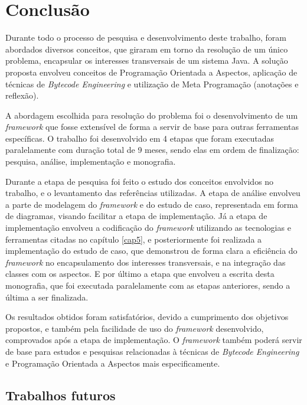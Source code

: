 \documentclass[tc,oneside]{iiufrgs}
\begin{document}
\chapter{Conclusão}

Durante todo o processo de pesquisa e desenvolvimento deste trabalho, foram abordados diversos conceitos, que giraram em torno da resolução de um único problema, encapsular os interesses transversais  de um sistema Java. A solução proposta envolveu conceitos de Programação Orientada a Aspectos, aplicação de técnicas de \textit{Bytecode Engineering} e utilização de Meta Programação (anotações e reflexão).

A abordagem escolhida para resolução do problema foi o desenvolvimento de um \textit{framework} que fosse extensível de forma a servir de base para outras ferramentas específicas. O trabalho foi desenvolvido em 4 etapas que foram executadas paralelamente com duração total de 9 meses, sendo elas em ordem de finalização: pesquisa, análise, implementação e monografia.

Durante a etapa de pesquisa foi feito o estudo dos conceitos envolvidos no trabalho, e o levantamento das referências utilizadas. A etapa de análise envolveu a parte de modelagem do \textit{framework} e do estudo de caso, representada em forma de diagramas, visando facilitar a etapa de implementação. Já a etapa de implementação envolveu a codificação do \textit{framework} utilizando as tecnologias e ferramentas citadas no capítulo \ref{cap5}, e posteriormente foi realizada a implementação do estudo de caso, que demonstrou de forma clara a eficiência do \textit{framework} no encapsulamento dos interesses transversais, e na integração das classes com os aspectos. E por último a etapa que envolveu a escrita desta monografia, que foi executada paralelamente com as etapas anteriores, sendo a última a ser finalizada.

Os resultados obtidos foram satisfatórios, devido a cumprimento dos objetivos propostos, e também pela facilidade de uso do \textit{framework} desenvolvido, comprovados após a etapa de implementação. O \textit{framework} também poderá servir de base para estudos e pesquisas relacionadas à técnicas de \textit{Bytecode Engineering} e Programação Orientada a Aspectos mais especificamente.

\section{Trabalhos futuros}
\end{document}

